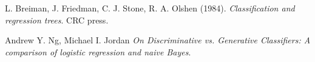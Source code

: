\begin{thebibliography}{999}

L. Breiman, J. Friedman, C. J. Stone, R. A. Olshen (1984).
\textit{Classification and regression trees}.
CRC press.


Andrew Y. Ng, Michael I. Jordan  
\textit{On Discriminative vs. Generative Classifiers: A comparison of logistic regression and naive Bayes}.

\end{thebibliography}
